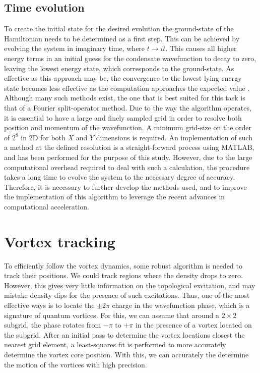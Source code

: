  \subsection{Time evolution}
 To create the initial state for the desired evolution the ground-state of the Hamiltonian needs to be determined as a first step. This can be achieved by evolving the system in imaginary time, where $t\rightarrow it$. This causes all higher energy terms in an initial guess for the condensate wavefunction to decay to zero, leaving the lowest energy state, which corresponds to the ground-state. As effective as this approach may be, the convergence to the lowest lying energy state becomes less effective as the computation approaches the expected value \cite{Vtx:Danaila_pra_2005}. Although many such methods exist, the one that is best suited for this task is that of a Fourier
 split-operator method. Due to the way the algorithm operates, it is essential to have a large and finely sampled grid in order to resolve both position and momentum of the
 wavefunction. A minimum grid-size on the order of $2^8$ in 2D for both $X$ and $Y$ dimensions is required. An implementation
 of such a method at the defined resolution is a straight-forward process using MATLAB, and has been performed for the purpose of this study.
 However, due to the large computational overhead required to deal with such a calculation, the procedure takes a long time to evolve the system to the necessary degree of accuracy. Therefore, it is necessary to further develop the methods used, and to improve the implementation of this algorithm to leverage the recent advances in computational acceleration.

 \section{Vortex tracking}
 To efficiently follow the vortex dynamics, some robust algorithm is needed to track their positions. We could track regions where the density drops to zero. However, this gives very little information on the topological excitation, and may mistake density dips for the presence of such excitations. Thus, one of the most effective ways is to locate the $\pm 2\pi$ charge in the wavefunction phase, which is a signature of quantum vortices. For this, we can assume that around a $2\times 2$ subgrid, the phase rotates from $-\pi$ to $+\pi$ in the presence of a vortex located on the subgrid. After an initial pass to determine the vortex locations closest the nearest grid element, a least-squares fit is performed to more accurately determine the vortex core position. With this, we can accurately the determine the motion of the vortices with high precision.

